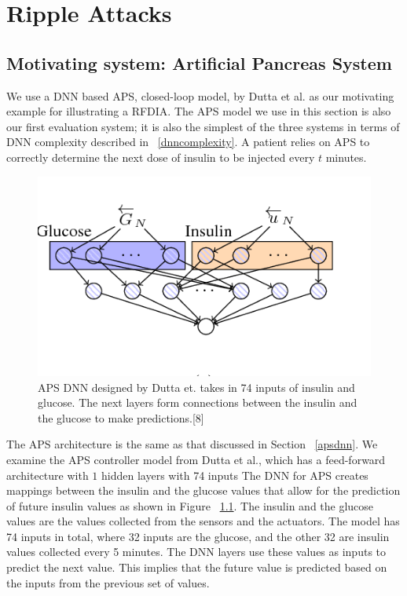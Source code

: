 \chapter{Ripple Attacks}
\label{attack}

\section{Motivating system: Artificial Pancreas System}


We use a DNN based \ac{APS}, closed-loop model, by Dutta et al. \cite{10.1007/978-3-319-99429-1_11}  as our motivating example for illustrating a \ac{RFDIA}. 
The \ac{APS} model we use in this section is also our first evaluation system; it is also the simplest of the three systems in terms of \ac{DNN} complexity described in ~\ref{dnncomplexity}.
A patient relies on  \ac{APS} to correctly determine the next dose of insulin to be injected every $t$ minutes. 

\begin{figure}
	\centering
	\includegraphics[width=0.7\linewidth, height=0.3\linewidth]{Images/APSDNN}
	\caption[APS DNN]{APS DNN designed by Dutta et. takes in 74 inputs of insulin and glucose. The next layers form connections between the insulin and the glucose to make predictions.[8]}
	\label{fig:apsdnn}
\end{figure}

The APS architecture is  the same as that discussed in Section ~\ref{apsdnn}. 
We examine the \ac{APS} controller model from Dutta et al., which has a feed-forward architecture with $1$ hidden layers  with 74 inputs 
The DNN for APS creates mappings between the insulin and the glucose values that allow for the prediction of future insulin values as shown in Figure ~\ref{fig:apsdnn}. 
The insulin and the glucose values are the values collected from the sensors and the actuators. 
The model has 74 inputs in total, where 32 inputs are the glucose, and the other 32  are insulin values collected every 5 minutes.
 The DNN layers use these values as inputs to predict the next value. 
 This implies that the future value is predicted based on the inputs from the previous set of values. 


